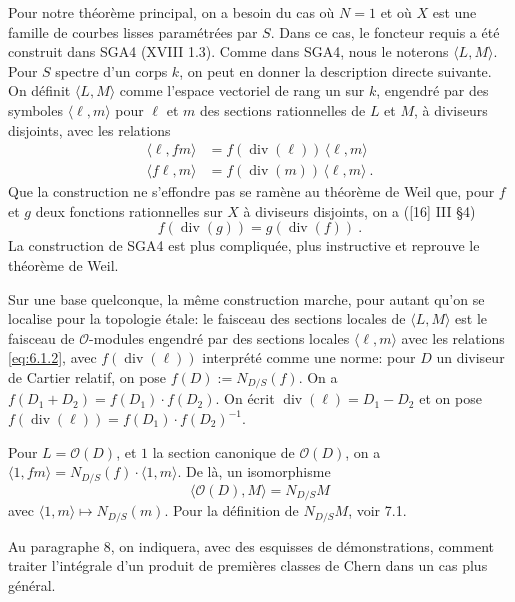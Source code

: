 \documentclass[12pt,a4paper]{article}
\theoremstyle{plain}
\theoremstyle{definition}
\theoremstyle{remark}
\DeclareMathOperator{\divm}{div}
\newcommand{\calO}{\mathcal{O}}
\begin{document}
Pour notre th\'eor\`eme principal, on a besoin du cas o\`u $N = 1$ et o\`u $X$ est une famille de courbes lisses param\'etr\'ees par $S$. Dans ce cas, le foncteur requis a \'et\'e construit dans SGA4 (XVIII 1.3). Comme dans SGA4, nous le noterons $\langle L, M \rangle$. Pour $S$ spectre d'un corps $k$, on peut en donner la description directe suivante. On d\'efinit $\langle L, M \rangle$ comme l'espace vectoriel de rang un sur $k$, engendr\'e par des symboles $\langle \ell, m \rangle$ pour $\ell$ et $m$ des sections rationnelles de $L$ et $M$, \`a diviseurs disjoints, avec les relations
\begin{equation}
\label{eq:6.1.2}
\begin{aligned}
\langle \ell, fm \rangle &= f(\divm(\ell)) \, \langle \ell, m \rangle \\
\langle f\ell, m \rangle &= f(\divm(m)) \, \langle \ell, m \rangle \ .
\end{aligned}
\end{equation}
Que la construction ne s'effondre pas se ram\`ene au th\'eor\`eme de Weil que, pour $f$ et $g$ deux fonctions rationnelles sur $X$ \`a diviseurs disjoints, on a ([16] III \S 4)
\[
f(\divm(g)) = g(\divm(f)) \ .
\]
La construction de SGA4 est plus compliqu\'ee, plus instructive et reprouve le th\'eor\`eme de Weil.

Sur une base quelconque, la m\^eme construction marche, pour autant qu'on se localise pour la topologie \'etale: le faisceau des sections locales de $\langle L, M \rangle$ est le faisceau de $\calO$-modules engendr\'e par des sections locales $\langle \ell, m \rangle$ avec les relations \eqref{eq:6.1.2}, avec $f(\divm(\ell))$ interpr\'et\'e comme une norme: pour $D$ un diviseur de Cartier relatif, on pose $f(D) := N_{D/S}(f)$. On a $f(D_1 + D_2) = f(D_1) \cdot f(D_2)$. On \'ecrit $\divm(\ell) = D_1 - D_2$ et on pose $f(\divm(\ell)) = f(D_1) \cdot f(D_2)^{-1}$.

Pour $L = \calO(D)$, et $1$ la section canonique de $\calO(D)$, on a $\langle 1, fm \rangle = N_{D/S}(f) \cdot \langle 1, m \rangle$. De l\`a, un isomorphisme
\begin{equation}
\label{eq:6.1.3}
\langle \calO(D), M \rangle = N_{D/S} M
\end{equation}
avec $\langle 1, m \rangle \mapsto N_{D/S}(m)$. Pour la d\'efinition de $N_{D/S} M$, voir 7.1.

Au paragraphe 8, on indiquera, avec des esquisses de d\'emonstrations, comment traiter l'int\'egrale d'un produit de premi\`eres classes de Chern dans un cas plus g\'en\'eral.
\end{document}
